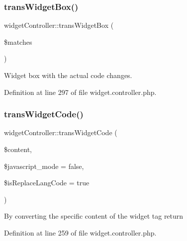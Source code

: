 \mbox{\label{classwidgetController_ad406bf4681c3dc1ccf37897479218111}} 
\subsubsection{\texorpdfstring{trans\+Widget\+Box()}{transWidgetBox()}}
{\footnotesize\ttfamily widget\+Controller\+::trans\+Widget\+Box (\begin{DoxyParamCaption}\item[{}]{\$matches }\end{DoxyParamCaption})}



Widget box with the actual code changes. 



Definition at line 297 of file widget.\+controller.\+php.

\mbox{\label{classwidgetController_a948e4ce023dc430a42607019bab5d878}} 
\subsubsection{\texorpdfstring{trans\+Widget\+Code()}{transWidgetCode()}}
{\footnotesize\ttfamily widget\+Controller\+::trans\+Widget\+Code (\begin{DoxyParamCaption}\item[{}]{\$content,  }\item[{}]{\$javascript\+\_\+mode = {\ttfamily false},  }\item[{}]{\$is\+Replace\+Lang\+Code = {\ttfamily true} }\end{DoxyParamCaption})}

By converting the specific content of the widget tag return 

Definition at line 259 of file widget.\+controller.\+php.

\mbox{\label{classwidgetController_acb8488ae3081bdfcf77dbd73740174be}} 
